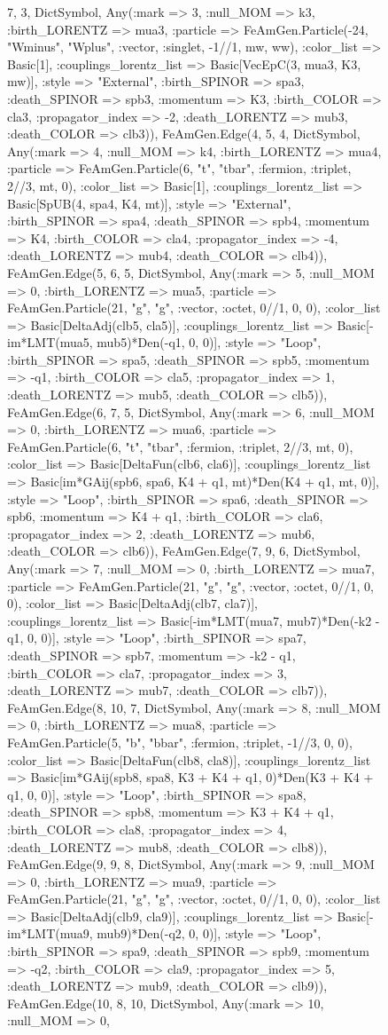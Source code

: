\documentclass{revtex4}
\begin{document}
\begin{figure}[!htb]
\begin{center}
{7, 3, Dict{Symbol, Any}(:mark => 3, :null_MOM => k3, :birth_LORENTZ => mua3, :particle => FeAmGen.Particle(-24, "Wminus", "Wplus", :vector, :singlet, -1//1, mw, ww), :color_list => Basic[1], :couplings_lorentz_list => Basic[VecEpC(3, mua3, K3, mw)], :style => "External", :birth_SPINOR => spa3, :death_SPINOR => spb3, :momentum => K3, :birth_COLOR => cla3, :propagator_index => -2, :death_LORENTZ => mub3, :death_COLOR => clb3)), FeAmGen.Edge(4, 5, 4, Dict{Symbol, Any}(:mark => 4, :null_MOM => k4, :birth_LORENTZ => mua4, :particle => FeAmGen.Particle(6, "t", "tbar", :fermion, :triplet, 2//3, mt, 0), :color_list => Basic[1], :couplings_lorentz_list => Basic[SpUB(4, spa4, K4, mt)], :style => "External", :birth_SPINOR => spa4, :death_SPINOR => spb4, :momentum => K4, :birth_COLOR => cla4, :propagator_index => -4, :death_LORENTZ => mub4, :death_COLOR => clb4)), FeAmGen.Edge(5, 6, 5, Dict{Symbol, Any}(:mark => 5, :null_MOM => 0, :birth_LORENTZ => mua5, :particle => FeAmGen.Particle(21, "g", "g", :vector, :octet, 0//1, 0, 0), :color_list => Basic[DeltaAdj(clb5, cla5)], :couplings_lorentz_list => Basic[-im*LMT(mua5, mub5)*Den(-q1, 0, 0)], :style => "Loop", :birth_SPINOR => spa5, :death_SPINOR => spb5, :momentum => -q1, :birth_COLOR => cla5, :propagator_index => 1, :death_LORENTZ => mub5, :death_COLOR => clb5)), FeAmGen.Edge(6, 7, 5, Dict{Symbol, Any}(:mark => 6, :null_MOM => 0, :birth_LORENTZ => mua6, :particle => FeAmGen.Particle(6, "t", "tbar", :fermion, :triplet, 2//3, mt, 0), :color_list => Basic[DeltaFun(clb6, cla6)], :couplings_lorentz_list => Basic[im*GAij(spb6, spa6, K4 + q1, mt)*Den(K4 + q1, mt, 0)], :style => "Loop", :birth_SPINOR => spa6, :death_SPINOR => spb6, :momentum => K4 + q1, :birth_COLOR => cla6, :propagator_index => 2, :death_LORENTZ => mub6, :death_COLOR => clb6)), FeAmGen.Edge(7, 9, 6, Dict{Symbol, Any}(:mark => 7, :null_MOM => 0, :birth_LORENTZ => mua7, :particle => FeAmGen.Particle(21, "g", "g", :vector, :octet, 0//1, 0, 0), :color_list => Basic[DeltaAdj(clb7, cla7)], :couplings_lorentz_list => Basic[-im*LMT(mua7, mub7)*Den(-k2 - q1, 0, 0)], :style => "Loop", :birth_SPINOR => spa7, :death_SPINOR => spb7, :momentum => -k2 - q1, :birth_COLOR => cla7, :propagator_index => 3, :death_LORENTZ => mub7, :death_COLOR => clb7)), FeAmGen.Edge(8, 10, 7, Dict{Symbol, Any}(:mark => 8, :null_MOM => 0, :birth_LORENTZ => mua8, :particle => FeAmGen.Particle(5, "b", "bbar", :fermion, :triplet, -1//3, 0, 0), :color_list => Basic[DeltaFun(clb8, cla8)], :couplings_lorentz_list => Basic[im*GAij(spb8, spa8, K3 + K4 + q1, 0)*Den(K3 + K4 + q1, 0, 0)], :style => "Loop", :birth_SPINOR => spa8, :death_SPINOR => spb8, :momentum => K3 + K4 + q1, :birth_COLOR => cla8, :propagator_index => 4, :death_LORENTZ => mub8, :death_COLOR => clb8)), FeAmGen.Edge(9, 9, 8, Dict{Symbol, Any}(:mark => 9, :null_MOM => 0, :birth_LORENTZ => mua9, :particle => FeAmGen.Particle(21, "g", "g", :vector, :octet, 0//1, 0, 0), :color_list => Basic[DeltaAdj(clb9, cla9)], :couplings_lorentz_list => Basic[-im*LMT(mua9, mub9)*Den(-q2, 0, 0)], :style => "Loop", :birth_SPINOR => spa9, :death_SPINOR => spb9, :momentum => -q2, :birth_COLOR => cla9, :propagator_index => 5, :death_LORENTZ => mub9, :death_COLOR => clb9)), FeAmGen.Edge(10, 8, 10, Dict{Symbol, Any}(:mark => 10, :null_MOM => 0, }
\end{center}
\end{figure}
\end{document}
